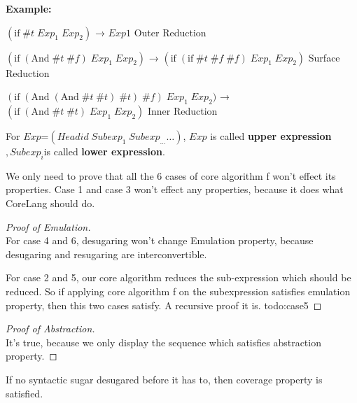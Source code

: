 {\bfseries Example:}

$(\mbox{if}\; \#t\; Exp_{1}\; Exp_{2})$ → $Exp1$ \hfill Outer Reduction

$(\mbox{if}\; (\mbox{And}\; \#t\; \#f)\; Exp_{1}\; Exp_{2})$ → $(\mbox{if}\; (\mbox{if}\; \#t\; \#f\; \#f)\; Exp_{1}\; Exp_{2})$ \hfill Surface Reduction

$(\mbox{if}\; (\mbox{And}\; (\mbox{And}\; \#t\; \#t)\; \#t)\; \#f)\; Exp_{1}\; Exp_{2})$ → $(\mbox{if}\; (\mbox{And}\; \#t\; \#t)\; Exp_{1}\; Exp_{2})$ \hfill Inner Reduction

\begin{Def}
For $Exp$=$(Headid\;Subexp_{1}\;Subexp_{\ldots} \ldots)$, $Exp$ is called {\bfseries upper expression}$,Subexp_{i}$is called {\bfseries lower expression}.
\end{Def}

We only need to prove that all the 6 cases of core algorithm f won't effect its properties. Case 1 and case 3 won't effect any properties, because it does what CoreLang should do.

\begin{proof}[Proof of Emulation]
\hfill\\
For case 4 and 6, desugaring won't change Emulation property, because desugaring and resugaring are interconvertible.

For case 2 and 5, our core algorithm reduces the sub-expression which should be reduced. So if applying core algorithm f on the subexpression satisfies emulation property, then this two cases satisfy. A recursive proof it is.
todo:case5
\end{proof}

\begin{proof}[Proof of Abstraction]
\hfill\\
It's true, because we only display the sequence which satisfies abstraction property.
\end{proof}

\begin{lemma}
If no syntactic sugar desugared before it has to, then coverage property is satisfied.
\end{lemma}


